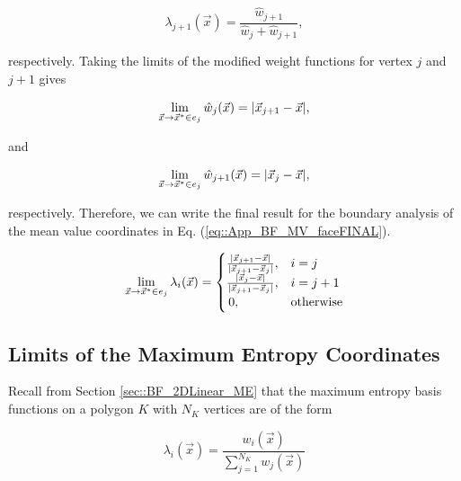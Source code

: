 \begin{equation}
\label{eq::App_BF_MVBF_mod_j1}
\lambda_{j+1} (\vec{x}) = \frac{\hat{w}_{j+1}   }{\hat{w}_j+ \hat{w}_{j+1} } ,
\end{equation}

\noindent respectively. Taking the limits of the modified weight functions for vertex $j$ and $j+1$ gives

\begin{equation}
\label{eq::App_BF_MVBF_weightmod_j}
\lim\displaylimits_{\vec{x} \rightarrow \vec{x}^* \in e_j}\hat{w}_j (\vec{x}) =  | \vec{x}_{j+1} - \vec{x} |,
\end{equation}

\noindent and

\begin{equation}
\label{eq::App_BF_MVBF_weightmod_j1}
\lim\displaylimits_{\vec{x} \rightarrow \vec{x}^* \in e_j} \hat{w}_{j+1} (\vec{x}) = | \vec{x}_j - \vec{x} |,
\end{equation}

\noindent respectively. Therefore, we can write the final result for the boundary analysis of the mean value coordinates in Eq. (\ref{eq::App_BF_MV_faceFINAL}).

\begin{equation}
\label{eq::App_BF_MV_faceFINAL}
\lim\displaylimits_{\vec{x} \rightarrow \vec{x}^* \in e_j} \lambda_i (\vec{x}) = 
\begin{cases}
\frac{| \vec{x}_{j+1} - \vec{x} |}{| \vec{x}_{j+1} - \vec{x}_{j} |},&i=j\\
\frac{| \vec{x}_{j} - \vec{x} |}{| \vec{x}_{j+1} - \vec{x}_{j} |},&i=j+1\\
\,0,&\text{otherwise}
\end{cases}
\end{equation} 

\subsection{Limits of the Maximum Entropy Coordinates}
\label{sec::appendix_BF_Limits_ME}

Recall from Section \ref{sec::BF_2DLinear_ME} that the maximum entropy basis functions on a polygon $K$ with $N_K$ vertices are of the form

\begin{equation}
\label{eq::App_BF_MEBF}
\lambda_i (\vec{x}) = \frac{w_i  (\vec{x}) }{\sum\limits_{j=1}^{N_K} w_j  (\vec{x}) }
\end{equation}


